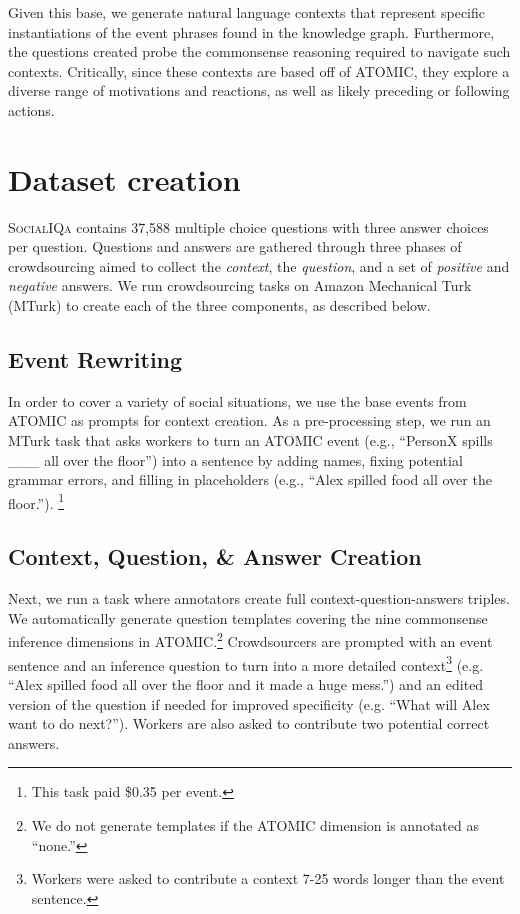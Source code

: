 Given this base, we generate natural language contexts that represent specific instantiations of the event phrases found in the knowledge graph.  Furthermore, the questions created probe the commonsense reasoning required to navigate such contexts.  Critically, since these contexts are based off of ATOMIC, they explore a diverse range of motivations and reactions, as well as likely preceding or following actions.

\section{Dataset creation}
\textsc{SocialIQa} contains 37,588 multiple choice questions with three answer choices per question. Questions and answers are gathered through three phases of crowdsourcing aimed to collect the \textit{context}, the \textit{question}, and a set of \textit{positive} and \textit{negative} answers. We run crowdsourcing tasks on Amazon Mechanical Turk (MTurk) to create each of the three components, as described below.

\subsection{Event Rewriting}

In order to cover a variety of social situations, we use the base events from ATOMIC as prompts for context creation. As a pre-processing step, we run an MTurk task that asks workers to turn an ATOMIC event (e.g., ``PersonX spills \_\_\_ all over the floor'') into a sentence by adding names, fixing potential grammar errors, and filling in placeholders (e.g., ``Alex spilled food all over the floor.'').
\footnote{This task paid \$0.35 per event.}

\subsection{Context, Question, \& Answer Creation} Next, we run a task where annotators create full context-question-answers triples. We automatically generate question templates covering the nine commonsense inference dimensions in ATOMIC.\footnote{We do not generate templates if the ATOMIC dimension is annotated as ``none.''} Crowdsourcers are prompted with an event sentence and an inference question to turn into a more detailed context\footnote{Workers were asked to contribute a context 7-25 words longer than the event sentence.} (e.g. ``Alex spilled food all over the floor and it made a huge mess.'') and an edited version of the question if needed for improved specificity (e.g. ``What will Alex want to do next?''). Workers are also asked to contribute two potential correct answers. 

